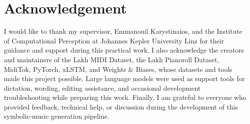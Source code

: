 \section{Acknowledgement}

I would like to thank my supervisor, Emmanouil Karystinaios, and the Institute
of Computational Perception at Johannes Kepler University Linz for their
guidance and support during this practical work. I also acknowledge the creators
and maintainers of the Lakh MIDI Dataset, the Lakh Pianoroll Dataset, MidiTok,
PyTorch, xLSTM, and Weights \& Biases, whose datasets and tools made this
project possible. Large language models were used as support tools for
dictation, wording, editing assistance, and occasional development
troubleshooting while preparing this work. Finally, I am grateful to everyone
who provided feedback, technical help, or discussion during the development of
this symbolic-music generation pipeline.
